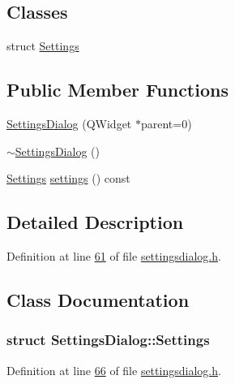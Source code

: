 \subsection*{Classes}
\begin{DoxyCompactItemize}
\item 
struct \hyperlink{a00022_dc/dfe/a00125}{Settings}
\end{DoxyCompactItemize}
\subsection*{Public Member Functions}
\begin{DoxyCompactItemize}
\item 
\hyperlink{a00022_abf4568621eef32ca85b919f2209cdc42}{Settings\+Dialog} (Q\+Widget $\ast$parent=0)
\item 
\hyperlink{a00022_ac48f54d4472902be0a3845a69167f068}{$\sim$\+Settings\+Dialog} ()
\item 
\hyperlink{a00022_dc/dfe/a00125}{Settings} \hyperlink{a00022_afeb533d711d0392b9856c63b40b65ad7}{settings} () const 
\end{DoxyCompactItemize}


\subsection{Detailed Description}


Definition at line \hyperlink{a00045_source_l00061}{61} of file \hyperlink{a00045_source}{settingsdialog.\+h}.



\subsection{Class Documentation}
\label{dc/dfe/a00125}
\hypertarget{a00022_dc/dfe/a00125}{}
\subsubsection{struct Settings\+Dialog\+:\+:Settings}


Definition at line \hyperlink{a00045_source_l00066}{66} of file \hyperlink{a00045_source}{settingsdialog.\+h}.



